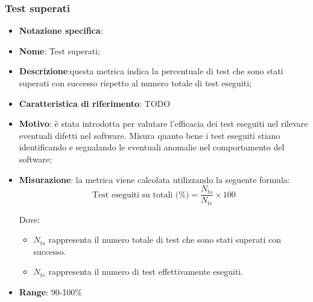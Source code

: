 \subsubsection{Test superati}
\begin{itemize}
    \item \textbf{Notazione specifica}:
    \item \textbf{Nome}: Test superati;
    \item \textbf{Descrizione}:questa metrica indica la percentuale di test che sono stati superati con successo rispetto al numero totale di test eseguiti;
    \item \textbf{Caratteristica di riferimento}: TODO
    \item \textbf{Motivo}: è stata introdotta per valutare l'efficacia dei test eseguiti nel rilevare eventuali difetti nel software. Misura quanto bene i test eseguiti stiano identificando e segnalando le eventuali anomalie nel comportamento del software;
    \item \textbf{Misurazione}: la metrica viene calcolata utilizzando la seguente formula:
        \[
        \text{Test eseguiti su totali (\%)} = \frac{N_{ts}}{N_{te}} \times 100
        \]
        
        Dove:
        \begin{itemize}
            \item $N_{ts}$ rappresenta il numero totale di test che sono stati superati con successo.
            \item $N_{te}$ rappresenta il numero di test effettivamente eseguiti.
        \end{itemize}
    \item \textbf{Range}: 90-100\%
\end{itemize}